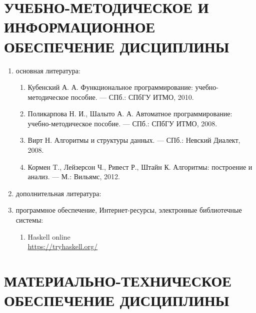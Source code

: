 \newpage
\section{УЧЕБНО-МЕТОДИЧЕСКОЕ И ИНФОРМАЦИОННОЕ ОБЕСПЕЧЕНИЕ ДИСЦИПЛИНЫ}

\begin{enumerate}
\item основная литература:
\begin{enumerate}
\item \label{funk} Кубенский А. А. Функциональное программирование: учебно-методическое пособие. — СПб.: СПбГУ ИТМО, 2010. \item \label{shalyto} Поликарпова Н. И., Шалыто А. А. Автоматное программирование: учебно-методическое пособие. — СПб.: СПбГУ ИТМО, 2008. \item \label{wirth} Вирт Н. Алгоритмы и структуры данных. — СПб.: Невский Диалект, 2008. \item \label{kormen} Кормен T., Лейзерсон Ч., Ривест Р., Штайн К. Алгоритмы: построение и анализ. — М.: Вильямс, 2012.
\end{enumerate}
 \item дополнительная литература:

 \item программное обеспечение, Интернет-ресурсы, электронные библиотечные системы:
\begin{enumerate}[resume]
\item \label{haskell} Haskell online\\ \url{https://tryhaskell.org/}
\end{enumerate}
\end{enumerate}

\newpage
\section{МАТЕРИАЛЬНО-ТЕХНИЧЕСКОЕ ОБЕСПЕЧЕНИЕ ДИСЦИПЛИНЫ}


